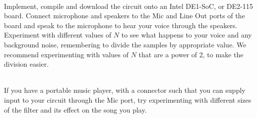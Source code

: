 \documentclass[epsfig,10pt,fullpage]{article}
\newcommand{\CommonDocsPath}{../../../common/docs}
\begin{document}
~\\
Implement, compile and download the circuit onto an Intel DE1-SoC, or DE2-115 board. Connect microphone and speakers to the {\sf Mic} and {\sf Line Out}
ports of the board and speak to the microphone to hear your voice through the speakers. Experiment with different values of $N$ to see what happens
to your voice and any background noise, remembering to divide the samples by appropriate value. We recommend experimenting with values of $N$ that are a power of 2, to make the division easier.

~\\
If you have a portable music player, with a connector such that you can supply input to your circuit through the {\sf Mic} port, try experimenting with
different sizes of the filter and its effect on the song you play. 




\end{document}
